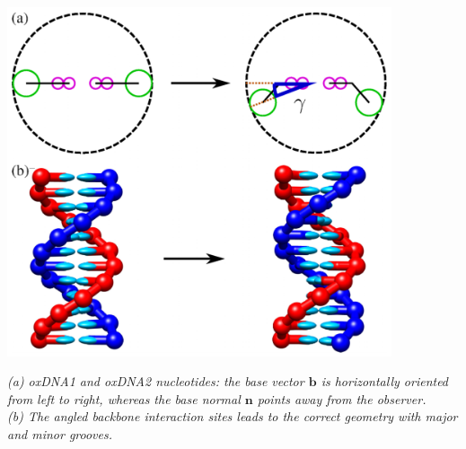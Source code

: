 \documentclass[slidestop,compress,9pt]{beamer}
\begin{document}
\begin{frame}
\begin{columns}
\begin{column}{0.44\textwidth}
\vspace*{-0.5cm}
\begin{center}
\includegraphics[width=0.85\textwidth]{oxdna_oxdna2.png}\\
\end{center}
\textit{(a) oxDNA1 and oxDNA2 nucleotides: the base vector $\bm{b}$ is horizontally oriented from left to right, whereas the base normal $\bm{n}$ points away from the observer.}\\[3pt]
\textit{(b) The angled backbone interaction sites leads to the correct geometry with major and minor grooves.} 
\end{column}
\end{columns}

\end{frame}
\end{document}
